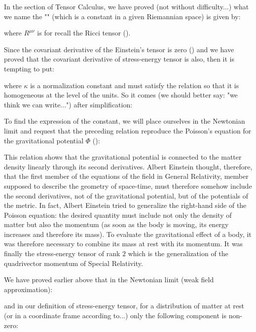 	In the section of Tensor Calculus, we have proved (not without difficulty...) what we name the "" (which is a constant in a given Riemannian space) is given by:
	
	where $R^{\mu\nu}$ is for recall the Ricci tensor ().
	
	Since the covariant derivative of the Einstein's tensor is zero () and we have proved that the covariant derivative of stress-energy tensor is also, then it is tempting to put:
	
	where $\kappa$ is a normalization constant and must satisfy the relation so that it is homogeneous at the level of the units. So it comes (we should better say: "we think we can write...") after simplification:
	
	To find the expression of the constant, we will place ourselves in the Newtonian limit and request that the preceding relation reproduce the Poisson's equation for the gravitational potential $\Phi$ ():
	
	\begin{tcolorbox}[title=Remark,colframe=black,arc=10pt]
	This relation shows that the gravitational potential is connected to the matter density linearly through its second derivatives. Albert Einstein thought, therefore, that the first member of the equations of the field in General Relativity, member supposed to describe the geometry of space-time, must therefore somehow include the second derivatives, not of the gravitational potential, but of the potentials of the metric. In fact, Albert Einstein tried to generalize the right-hand side of the Poisson equation: the desired quantity must include not only the density of matter but also the momentum (as soon as the body is moving, its energy increases and therefore its mass). To evaluate the gravitational effect of a body, it was therefore necessary to combine its mass at rest with its momentum. It was finally the stress-energy tensor of rank $2$ which is the generalization of the quadrivector momentum of Special Relativity.
	\end{tcolorbox}
	We have proved earlier above that in the Newtonian limit (weak field approximation):
	
	and in our definition of stress-energy tensor, for a distribution of matter at rest (or in a coordinate frame according to...) only the following component is non-zero:
	
